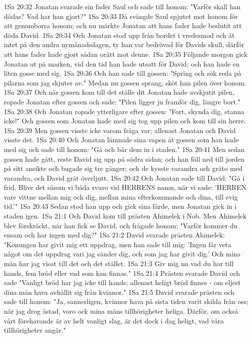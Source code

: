 1Sa 20:32  Jonatan svarade sin fader Saul och sade till honom: "Varför skall han dödas? Vad har han gjort?"
1Sa 20:33  Då svängde Saul spjutet mot honom för att genomborra honom; och nu märkte Jonatan att hans fader hade beslutit att döda David.
1Sa 20:34  Och Jonatan stod upp från bordet i vredesmod och åt intet på den andra nymånadsdagen, ty han var bedrövad för Davids skull, därför att hans fader hade gjort sådan orätt mot denne.
1Sa 20:35  Följande morgon gick Jonatan ut på marken, vid den tid han hade utsatt för David; och han hade en liten gosse med sig.
1Sa 20:36  Och han sade till gossen: "Spring och sök reda på pilarna som jag skjuter av." Medan nu gossen sprang, sköt han pilen över honom.
1Sa 20:37  Och när gossen kom till det ställe dit Jonatan hade avskjutit pilen, ropade Jonatan efter gossen och sade: "Pilen ligger ju framför dig, längre bort."
1Sa 20:38  Och Jonatan ropade ytterligare efter gossen: "Fort, skynda dig, stanna icke!" Och gossen som Jonatan hade med sig tog upp pilen och kom till sin herre.
1Sa 20:39  Men gossen visste icke varom fråga var; allenast Jonatan och David visste det.
1Sa 20:40  Och Jonatan lämnade sina vapen åt gossen som han hade med sig och sade till honom: "Gå och bär dem in i staden."
1Sa 20:41  Men sedan gossen hade gått, reste David sig upp på södra sidan; och han föll ned till jorden på sitt ansikte och bugade sig tre gånger; och de kysste varandra och gräto med varandra, och David grät överljutt.
1Sa 20:42  Och Jonatan sade till David: "Gå i frid. Blive det såsom vi båda svuro vid HERRENS namn, när vi sade: 'HERREN vare vittne mellan mig och dig, mellan mina efterkommande och dina, till evig tid.'"
1Sa 20:43  Sedan stod han upp och gick sina färde, men Jonatan gick in i staden igen.
1Sa 21:1  Och David kom till prästen Ahimelek i Nob. Men Ahimelek blev förskräckt, när han fick se David, och frågade honom: "Varför kommer du ensam och har ingen med dig?"
1Sa 21:2  David svarade prästen Ahimelek: "Konungen har givit mig ett uppdrag, men han sade till mig: 'Ingen får veta något om det uppdrag vari jag sänder dig, och som jag har givit dig.' Och mina män har jag visat till det och det stället.
1Sa 21:3  Giv mig nu vad du har till hands, fem bröd eller vad som kan finnas."
1Sa 21:4  Prästen svarade David och sade "Vanligt bröd har jag icke till hands; allenast heligt bröd finnes - om eljest dina män hava avhållit sig från kvinnor."
1Sa 21:5  David svarade prästen och sade till honom: "Ja, sannerligen, kvinnor hava på sista tiden varit skilda från oss; när jag drog åstad, voro ock mina mäns tillhörigheter heliga. Därför, om också vårt förehavande är av helt vanligt slag, är det dock i dag heligt, vad våra tillhörigheter angår."
